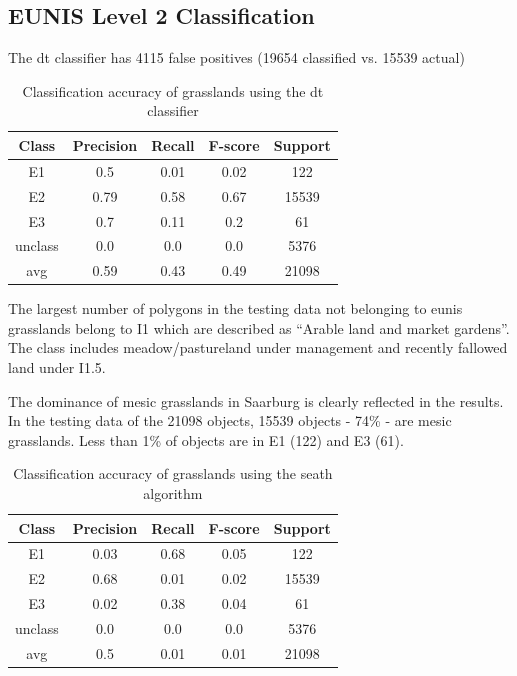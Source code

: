 \documentclass[authoryear,review,12pt,number]{elsarticle}
\begin{document}
\subsection{EUNIS Level 2 Classification}
\label{subsec:level2_classification}
The \gls{dt} classifier has 4115 false
positives (19654 classified vs. 15539 actual) 
\begin{table}
\centering
\begin{tabular}{c c c c c}
Class & Precision & Recall & F-score & Support\\
\hline
E1 & 0.5 & 0.01 & 0.02 & 122\\
E2 & 0.79 & 0.58 & 0.67 & 15539\\
E3 & 0.7 & 0.11 & 0.2 & 61\\
unclass & 0.0 & 0.0 & 0.0 & 5376\\
avg & 0.59 & 0.43 & 0.49 & 21098\\
\end{tabular}
\caption{Classification accuracy of grasslands using the \gls{dt} 
classifier\label{fig:dt_lvl2_classification}}
\end{table}
The largest number of polygons in the testing data not belonging to \gls{eunis}
grasslands belong to I1 which are described as ``Arable land and
market gardens''. The class includes meadow/pastureland under management and
recently fallowed land under I1.5. 

The dominance of mesic grasslands in Saarburg is clearly reflected in
the results. In the testing data of the 21098 objects, 15539 objects - 74\% -
are mesic grasslands. Less than 1\% of objects are in E1 (122) and E3 (61). 
\begin{table}
\centering
\begin{tabular}{c c c c c}
Class & Precision & Recall & F-score & Support\\
\hline
E1 & 0.03 & 0.68 & 0.05 & 122\\
E2 & 0.68 & 0.01 & 0.02 & 15539\\
E3 & 0.02 & 0.38 & 0.04 & 61\\
unclass & 0.0 & 0.0 & 0.0 & 5376\\
avg & 0.5 & 0.01 & 0.01 & 21098\\
\end{tabular}
\caption{Classification accuracy of grasslands using the \gls{seath}
algorithm\label{fig:seath_lvl2_classification}}
\end{table}

\end{document}
